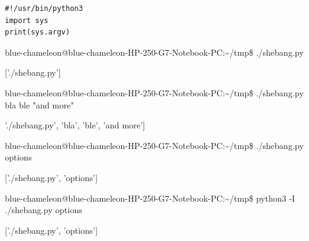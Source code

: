 \begin{frame}[fragile]
%
\begin{codebox}
\begin{verbatim}
#!/usr/bin/python3
import sys
print(sys.argv)
\end{verbatim}
\end{codebox}
%
\begin{cmdbox}
\scriptsize
{\color{green}blue-chameleon@blue-chameleon-HP-250-G7-Notebook-PC}:{\color{blue}\textasciitilde/tmp}\$
./shebang.py

['./shebang.py']

{\color{green}blue-chameleon@blue-chameleon-HP-250-G7-Notebook-PC}:{\color{blue}\textasciitilde/tmp}\$
./shebang.py bla ble "and more"

'./shebang.py', 'bla', 'ble', 'and more']

{\color{green}blue-chameleon@blue-chameleon-HP-250-G7-Notebook-PC}:{\color{blue}\textasciitilde/tmp}\$
./shebang.py options

['./shebang.py', 'options']

{\color{green}blue-chameleon@blue-chameleon-HP-250-G7-Notebook-PC}:{\color{blue}\textasciitilde/tmp}\$
python3 -I ./shebang.py options

['./shebang.py', 'options']
\end{cmdbox}
%
\end{frame}


